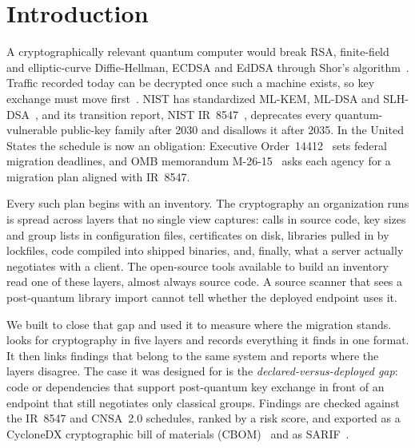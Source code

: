 \section{Introduction}

A cryptographically relevant quantum computer would break RSA, finite-field
and elliptic-curve Diffie-Hellman, ECDSA and EdDSA through Shor's
algorithm~\cite{shor1997}. Traffic recorded today can be decrypted once such a
machine exists, so key exchange must move first~\cite{mosca2018}. NIST has
standardized ML-KEM, ML-DSA and SLH-DSA~\cite{fips203,fips204,fips205}, and
its transition report, NIST IR~8547~\cite{ir8547}, deprecates every
quantum-vulnerable public-key family after 2030 and disallows it after 2035.
In the United States the schedule is now an obligation: Executive
Order~14412~\cite{eo14412} sets federal migration deadlines, and OMB memorandum
M-26-15~\cite{omb2615} asks each agency for a migration plan aligned with
IR~8547.

Every such plan begins with an inventory. The cryptography an organization
runs is spread across layers that no single view captures: calls in source
code, key sizes and group lists in configuration files, certificates on disk,
libraries pulled in by lockfiles, code compiled into shipped binaries, and,
finally, what a server actually negotiates with a client. The open-source tools
available to build an inventory read one of these layers, almost always
source code. A source scanner that sees a post-quantum library import cannot
tell whether the deployed endpoint uses it.

We built \tool{} to close that gap and used it to measure where the migration
stands. \tool{} looks for cryptography in five layers and records everything it
finds in one format. It then links findings that belong to the same system and
reports where the layers disagree. The case it was designed for is the
\emph{declared-versus-deployed gap}: code or dependencies that support
post-quantum key exchange in front of an endpoint that still negotiates only
classical groups. Findings are checked against the IR~8547 and CNSA~2.0
schedules, ranked by a risk score, and exported as a CycloneDX cryptographic
bill of materials (CBOM)~\cite{cyclonedx} and as SARIF~\cite{sarif}.

